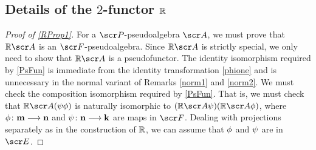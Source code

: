 \documentclass{amsart}
\theoremstyle{definition}
\numberwithin{equation}{section}
\begin{document}
\subsection{Details of the $2$-functor $\mathbb{R}$}\label{Rdetails}

\begin{proof}[Proof of \autoref{RProp1}] For a $\sP$-pseudoalgebra $\sA$, we must prove that $\bR\sA$ is an $\sF$-pseudoalgebra.  Since $\bR\sA$ is strictly special, we only need to show that $\bR\sA$ is a pseudofunctor.  The identity isomorphism required by \autoref{PsFun} is immediate from the identity transformation \autoref{phione} and is unnecessary in the normal variant of Remarks \ref{norm1} and \ref{norm2}.  We must check the composition isomorphism required by \autoref{PsFun}.   That is, we
must check that $\bR\sA(\psi\phi)$ is naturally isomorphic to $(\bR\sA\psi)(\bR\sA\phi)$, where $\phi\colon \textbf{m}\longrightarrow\textbf{n}$ and $\psi\colon \textbf{n}\longrightarrow\textbf{k}$ are maps in $\sF$.  Dealing with projections separately as in the construction of $\mathbb{R}$, we can assume that $\phi$ and $\psi$ are in $\sE$.  


\end{proof}
\end{document}
